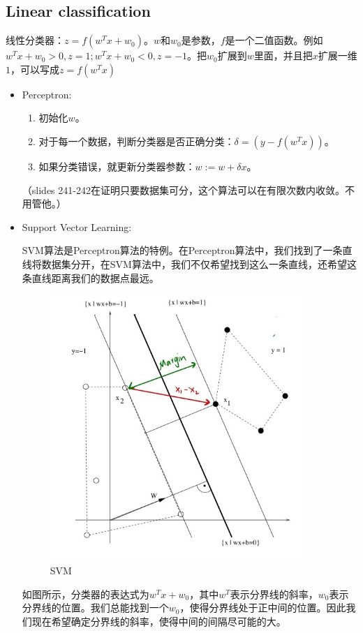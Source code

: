 \documentclass[12pt, a4paper, oneside]{ctexart}
\begin{document}
\subsection{Linear classification}
线性分类器：$z=f(w^Tx+w_0)$。$w$和$w_0$是参数，$f$是一个二值函数。例如$w^Tx+w_0>0,z=1;w^Tx+w_0<0,z=-1$。把$w_0$扩展到$w$里面，并且把$x$扩展一维$1$，可以写成$z=f(w^Tx)$
\begin{itemize}
    \item Perceptron:
    \begin{enumerate}
        \item 初始化$w$。
        \item 对于每一个数据，判断分类器是否正确分类：$\delta = (y-f(w^Tx))$。
        \item 如果分类错误，就更新分类器参数：$w:=w+\delta x$。
    \end{enumerate}
    （slides 241-242在证明只要数据集可分，这个算法可以在有限次数内收敛。不用管他。）
    \item Support Vector Learning:
    
    SVM算法是Perceptron算法的特例。在Perceptron算法中，我们找到了一条直线将数据集分开，在SVM算法中，我们不仅希望找到这么一条直线，还希望这条直线距离我们的数据点最远。
    \begin{figure}[htbp]
        \centering
        \includegraphics[width=0.9\textwidth]{dm-244.jpg}
        \caption{SVM}
    \end{figure}
    如图所示，分类器的表达式为$w^Tx+w_0$，其中$w^T$表示分界线的斜率，$w_0$表示分界线的位置。我们总能找到一个$w_0$，使得分界线处于正中间的位置。因此我们现在希望确定分界线的斜率，使得中间的间隔尽可能的大。


\end{itemize}
\end{document}
